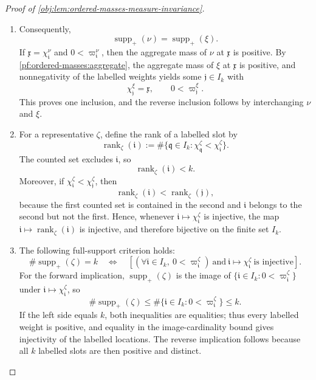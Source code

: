 \documentclass[11pt]{article}
\begin{document}
\begin{proof}[Proof of \cref{obj:lem:ordered-masses-measure-invariance}]
\begin{enumerate}
\item\label{pf:ordered-masses:support}
Consequently,
\[
\operatorname{supp}_+(\nu)=\operatorname{supp}_+(\xi).
\]
If \(\mathfrak x=\chi^\nu_{\mathfrak i}\) and \(0<\varpi^\nu_{\mathfrak i}\), then the aggregate mass of \(\nu\) at \(\mathfrak x\) is positive.  By \cref{pf:ordered-masses:aggregate}, the aggregate mass of \(\xi\) at \(\mathfrak x\) is positive, and nonnegativity of the labelled weights yields some \(\mathfrak j\in I_k\) with
\[
\chi^\xi_{\mathfrak j}=\mathfrak x,
\qquad
0<\varpi^\xi_{\mathfrak j}.
\]
This proves one inclusion, and the reverse inclusion follows by interchanging \(\nu\) and \(\xi\).

\item\label{pf:ordered-masses:rank}
For a representative \(\zeta\), define the rank of a labelled slot by
\[
\operatorname{rank}_{\zeta}(\mathfrak i)
:=
\#\{\mathfrak q\in I_k:\chi^\zeta_{\mathfrak q}<\chi^\zeta_{\mathfrak i}\}.
\]
The counted set excludes \(\mathfrak i\), so
\[
\operatorname{rank}_{\zeta}(\mathfrak i)<k .
\]
Moreover, if \(\chi^\zeta_{\mathfrak i}<\chi^\zeta_{\mathfrak j}\), then
\[
\operatorname{rank}_{\zeta}(\mathfrak i)
<
\operatorname{rank}_{\zeta}(\mathfrak j),
\]
because the first counted set is contained in the second and \(\mathfrak i\) belongs to the second but not the first.  Hence, whenever
\(\mathfrak i\mapsto\chi^\zeta_{\mathfrak i}\) is injective, the map
\(\mathfrak i\mapsto\operatorname{rank}_{\zeta}(\mathfrak i)\) is injective, and therefore bijective on the finite set \(I_k\).

\item\label{pf:ordered-masses:full-support}
The following full-support criterion holds:
\[
\#\operatorname{supp}_+(\zeta)=k
\quad\Longleftrightarrow\quad
\left[
(\forall \mathfrak i\in I_k,\ 0<\varpi^\zeta_{\mathfrak i})
\ \text{and}\
\mathfrak i\mapsto\chi^\zeta_{\mathfrak i}\ \text{is injective}
\right].
\]
For the forward implication, \(\operatorname{supp}_+(\zeta)\) is the image of
\(\{\mathfrak i\in I_k:0<\varpi^\zeta_{\mathfrak i}\}\) under
\(\mathfrak i\mapsto\chi^\zeta_{\mathfrak i}\), so
\[
\#\operatorname{supp}_+(\zeta)
\le
\#\{\mathfrak i\in I_k:0<\varpi^\zeta_{\mathfrak i}\}
\le k .
\]
If the left side equals \(k\), both inequalities are equalities; thus every labelled weight is positive, and equality in the image-cardinality bound gives injectivity of the labelled locations.  The reverse implication follows because all \(k\) labelled slots are then positive and distinct.


\end{enumerate}
\end{proof}
\end{document}
